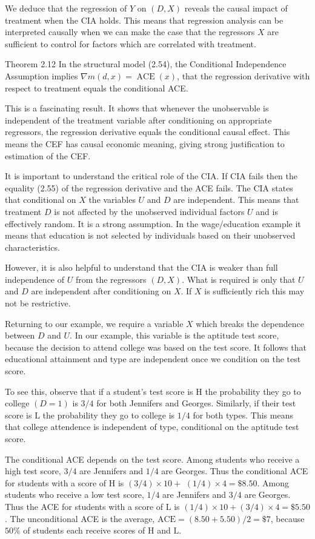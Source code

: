 \documentclass[10pt]{article}
\begin{document}
We deduce that the regression of $Y$ on $(D, X)$ reveals the causal impact of treatment when the CIA holds. This means that regression analysis can be interpreted causally when we can make the case that the regressors $X$ are sufficient to control for factors which are correlated with treatment.

Theorem 2.12 In the structural model (2.54), the Conditional Independence Assumption implies $\nabla m(d, x)=\operatorname{ACE}(x)$, that the regression derivative with respect to treatment equals the conditional ACE.

This is a fascinating result. It shows that whenever the unobservable is independent of the treatment variable after conditioning on appropriate regressors, the regression derivative equals the conditional causal effect. This means the CEF has causal economic meaning, giving strong justification to estimation of the CEF.

It is important to understand the critical role of the CIA. If CIA fails then the equality (2.55) of the regression derivative and the ACE fails. The CIA states that conditional on $X$ the variables $U$ and $D$ are independent. This means that treatment $D$ is not affected by the unobserved individual factors $U$ and is effectively random. It is a strong assumption. In the wage/education example it means that education is not selected by individuals based on their unobserved characteristics.

However, it is also helpful to understand that the CIA is weaker than full independence of $U$ from the regressors $(D, X)$. What is required is only that $U$ and $D$ are independent after conditioning on $X$. If $X$ is sufficiently rich this may not be restrictive.

Returning to our example, we require a variable $X$ which breaks the dependence between $D$ and $U$. In our example, this variable is the aptitude test score, because the decision to attend college was based on the test score. It follows that educational attainment and type are independent once we condition on the test score.

To see this, observe that if a student's test score is $\mathrm{H}$ the probability they go to college $(D=1)$ is $3 / 4$ for both Jennifers and Georges. Similarly, if their test score is $\mathrm{L}$ the probability they go to college is $1 / 4$ for both types. This means that college attendence is independent of type, conditional on the aptitude test score.

The conditional ACE depends on the test score. Among students who receive a high test score, $3 / 4$ are Jennifers and $1 / 4$ are Georges. Thus the conditional ACE for students with a score of $\mathrm{H}$ is $(3 / 4) \times 10+$ $(1 / 4) \times 4=\$ 8.50$. Among students who receive a low test score, $1 / 4$ are Jennifers and $3 / 4$ are Georges. Thus the ACE for students with a score of $\mathrm{L}$ is $(1 / 4) \times 10+(3 / 4) \times 4=\$ 5.50$. The unconditional ACE is the average, $\mathrm{ACE}=(8.50+5.50) / 2=\$ 7$, because $50 \%$ of students each receive scores of $\mathrm{H}$ and $\mathrm{L}$.
\end{document}
